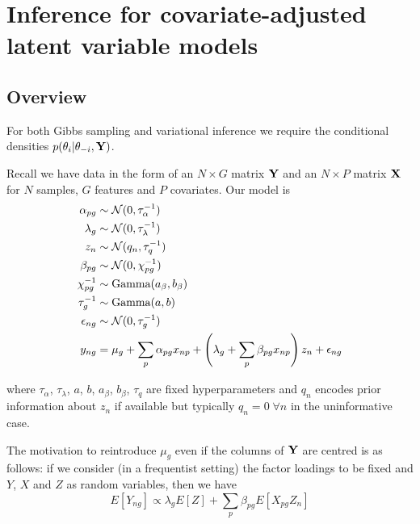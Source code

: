 
\chapter{Inference for covariate-adjusted latent variable models} \label{app:clvm}

\section{Overview}

For both Gibbs sampling and variational inference we require the conditional densities $p(\theta_i | \theta_{-i}, {\bf Y})$.

Recall we have data in the form of an $N \times G$ matrix ${\bf Y}$ and an $N \times P$ matrix ${\bf X}$ for $N$ samples, $G$ features and $P$ covariates. Our model is
\begin{equation}
\begin{aligned}
\alpha_{pg} & \sim \mathcal{N}(0, \tau_\alpha^{-1}) \\
\lambda_g & \sim \mathcal{N}(0, \tau_\lambda^{-1}) \\
z_n & \sim \mathcal{N}(q_n, \tau_q^{-1}) \\
\beta_{pg} & \sim \mathcal{N}(0, \chi_{pg}^{-1}) \\
\chi_{pg}^{-1} & \sim \text{Gamma}(a_\beta, b_\beta) \\
\tau_{g}^{-1} & \sim \text{Gamma}(a, b) \\
\epsilon_{ng} & \sim \mathcal{N}(0, \tau_g^{-1}) \\
y_{ng} & =  \mu_g + \sum_p \alpha_{pg} x_{np} + \left( \lambda_g + \sum_p \beta_{pg} x_{np} \right) z_n + \epsilon_{ng}
\end{aligned} \label{eq:clvm_model}
\end{equation}

where $\tau_\alpha$, $\tau_\lambda$, $a$, $b$, $a_\beta$, $b_\beta$, $\tau_q$ are fixed hyperparameters and $q_n$ encodes prior information about $z_n$ if available but typically $q_n = 0 \; \forall n$ in the uninformative case.



The motivation to reintroduce $\mu_g$ even if the columns of ${\bf Y}$ are centred is as follows: if we consider (in a frequentist setting) the factor loadings to be fixed and $Y$, $X$ and $Z$ as random variables, then we have
\begin{equation}
E[Y_{ng}] \propto \lambda_g E[Z] + \sum_p \beta_{pg} E[X_{pg}Z_n]
\end{equation}

